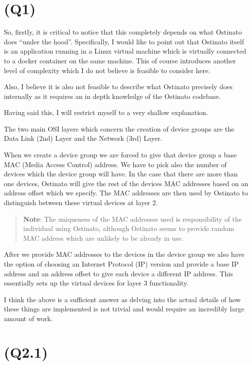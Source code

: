 \hypertarget{q1}{%
\section{(Q1)}\label{q1}}

So, firstly, it is critical to notice that this completely depends on
what Ostinato does ``under the hood''. Specifically, I would like to
point out that Ostinato itself is an application running in a Linux
virtual machine which is virtually connected to a docker container on
the same machine. This of course introduces another level of complexity
which I do not believe is feasible to consider here.

Also, I believe it is also not feasible to describe what Ostinato
precisely does internally as it requires an in depth knowledge of the
Ostinato codebase.

Having said this, I will restrict myself to a very shallow explanation.

The two main OSI layers which concern the creation of device groups are
the Data Link (2nd) Layer and the Network (3rd) Layer.

When we create a device group we are forced to give that device group a
base MAC (Media Access Control) address. We have to pick also the number
of devices which the device group will have. In the case that there are
more than one devices, Ostinato will give the rest of the devices MAC
addresses based on an address offset which we specify. The MAC addresses
are then used by Ostinato to distinguish between these virtual devices
at layer 2.

\begin{quote}
\textbf{Note}: The uniqueness of the MAC addresses used is
responsibility of the individual using Ostinato, although Ostinato seems
to provide random MAC address which are unlikely to be already in use.
\end{quote}

After we provide MAC addresses to the devices in the device group we
also have the option of choosing an Internet Protocol (IP) version and
provide a base IP address and an address offset to give each device a
different IP address. This essentially sets up the virtual devices for
layer 3 functionality.

I think the above is a sufficient answer as delving into the actual
details of how these things are implemented is not trivial and would
require an incredibly large amount of work.

\hypertarget{q2.1}{%
\section{(Q2.1)}\label{q2.1}}

